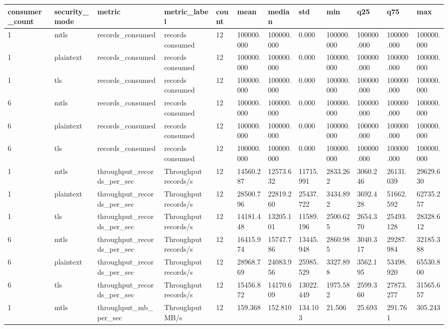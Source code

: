 \begin{longtable}{llllllllllll}
\hline
consumer\_count & security\_mode & metric & metric\_label & count & mean & median & std & min & q25 & q75 & max \\
\hline
1 & mtls & records\_consumed & records consumed & 12 & 100000.000 & 100000.000 & 0.000 & 100000.000 & 100000.000 & 100000.000 & 100000.000 \\
1 & plaintext & records\_consumed & records consumed & 12 & 100000.000 & 100000.000 & 0.000 & 100000.000 & 100000.000 & 100000.000 & 100000.000 \\
1 & tls & records\_consumed & records consumed & 12 & 100000.000 & 100000.000 & 0.000 & 100000.000 & 100000.000 & 100000.000 & 100000.000 \\
6 & mtls & records\_consumed & records consumed & 12 & 100000.000 & 100000.000 & 0.000 & 100000.000 & 100000.000 & 100000.000 & 100000.000 \\
6 & plaintext & records\_consumed & records consumed & 12 & 100000.000 & 100000.000 & 0.000 & 100000.000 & 100000.000 & 100000.000 & 100000.000 \\
6 & tls & records\_consumed & records consumed & 12 & 100000.000 & 100000.000 & 0.000 & 100000.000 & 100000.000 & 100000.000 & 100000.000 \\
1 & mtls & throughput\_records\_per\_sec & Throughput records/s & 12 & 14560.287 & 12573.632 & 11715.991 & 2833.262 & 3060.246 & 26131.039 & 29629.630 \\
1 & plaintext & throughput\_records\_per\_sec & Throughput records/s & 12 & 28500.796 & 22819.260 & 25437.722 & 3434.892 & 3692.428 & 51662.592 & 62735.257 \\
1 & tls & throughput\_records\_per\_sec & Throughput records/s & 12 & 14181.448 & 13205.101 & 11589.196 & 2500.625 & 2654.370 & 25493.128 & 28328.612 \\
6 & mtls & throughput\_records\_per\_sec & Throughput records/s & 12 & 16415.974 & 15747.786 & 13445.948 & 2860.985 & 3040.317 & 29287.984 & 32185.388 \\
6 & plaintext & throughput\_records\_per\_sec & Throughput records/s & 12 & 28968.769 & 24083.956 & 25985.529 & 3327.898 & 3562.195 & 53498.920 & 65530.800 \\
6 & tls & throughput\_records\_per\_sec & Throughput records/s & 12 & 15456.872 & 14170.609 & 13022.449 & 1975.582 & 2599.360 & 27873.277 & 31565.657 \\
1 & mtls & throughput\_mb\_per\_sec & Throughput MB/s & 12 & 159.368 & 152.810 & 134.103 & 21.506 & 25.693 & 291.761 & 305.243 \\

\end{longtable}
